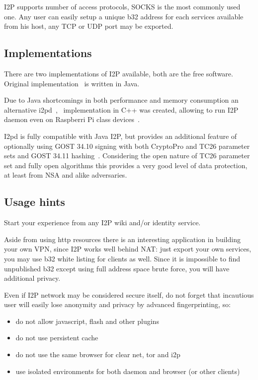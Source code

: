 \documentclass[10pt, a5paper]{article}
\begin{document}
I2P supports number of access protocols, SOCKS is the most \linebreak commonly used one. Any user can easily setup a unique b32 address for each services available from his host, any TCP or UDP port may be exported.

\subsection*{Implementations}

There are two implementations of I2P available, both are the free software. Original implementation~\cite{Savchenko-4} is written in Java.

Due to Java shortcomings in both performance and memory \linebreak consumption an alternative i2pd~\cite{Savchenko-5},~\cite{Savchenko-6} implementation in C++ was created, allowing to run I2P daemon even on Raspberri Pi class \linebreak devices~\cite{Savchenko-7}.

I2pd is fully compatible with Java I2P, but provides an additional feature of optionally using GOST 34.10 signing with both CryptoPro and TC26 parameter sets and GOST 34.11 hashing~\cite{Savchenko-8}. Considering the open nature of TC26 parameter set and fully open algorithms this provides a very good level of data protection, at least from NSA and alike adversaries.

\subsection*{Usage hints}

Start your experience from any I2P wiki and/or identity service.

Aside from using http resources there is an interesting application in building your own VPN, since I2P works well behind NAT: just export your own services, you may use b32 white listing for clients as well. Since it is impossible to find unpublished b32 except using full address space brute force, you will have additional privacy.

Even if I2P network may be considered secure itself, do not forget that incautious user will easily lose anonymity and privacy by advanced fingerprinting, so:

\begin{itemize}
  \item do not allow javascript, flash and other plugins
  \item do not use persistent cache
  \item do not use the same browser for clear net, tor and i2p
  \item use isolated environments for both daemon and browser (or other clients)
\end{itemize}
\end{document}
